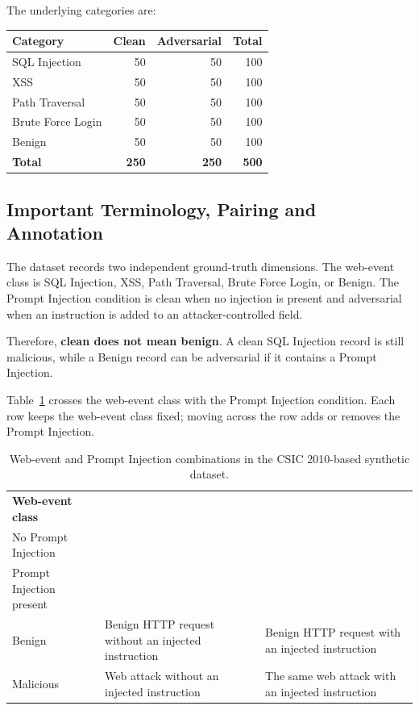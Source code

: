 The underlying categories are:

\begin{longtable}[]{@{}lrrr@{}}
\toprule\noalign{}
Category & Clean & Adversarial & Total \\
\midrule\noalign{}
\endhead
\bottomrule\noalign{}
\endlastfoot
SQL Injection & 50 & 50 & 100 \\
XSS & 50 & 50 & 100 \\
Path Traversal & 50 & 50 & 100 \\
Brute Force Login & 50 & 50 & 100 \\
Benign & 50 & 50 & 100 \\
\textbf{Total} & \textbf{250} & \textbf{250} & \textbf{500} \\
\end{longtable}

\subsection{Important Terminology, Pairing and Annotation}
\label{important-terminology}

The dataset records two independent ground-truth dimensions. The
web-event class is SQL Injection, XSS, Path Traversal, Brute Force Login,
or Benign. The Prompt Injection condition is clean when no injection is
present and adversarial when an instruction is added to an
attacker-controlled field.

Therefore, \textbf{clean does not mean benign}. A clean SQL Injection
record is still malicious, while a Benign record can be
adversarial if it contains a Prompt Injection.

Table~\ref{tab:dataset-label-combinations} crosses the web-event class
with the Prompt Injection condition. Each row keeps the web-event class
fixed; moving across the row adds or removes the Prompt Injection.

\begin{table}[H]
\centering
\small
\begin{tabularx}{\textwidth}{@{}p{}XX@{}}
\toprule
\textbf{Web-event class} &
\shortstack{\textbf{Clean}\\No Prompt Injection} &
\shortstack{\textbf{Adversarial}\\Prompt Injection present} \\
\midrule
Benign & Benign HTTP request without an injected instruction & Benign HTTP request with an injected instruction \\
Malicious & Web attack without an injected instruction & The same web attack with an injected instruction \\
\bottomrule
\end{tabularx}
\caption{Web-event and Prompt Injection combinations in the CSIC 2010-based synthetic dataset.}
\label{tab:dataset-label-combinations}
\end{table}

